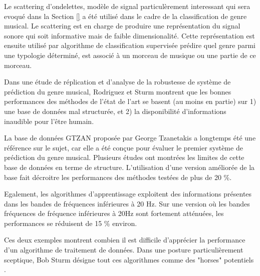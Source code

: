 Le scattering d'ondelettes, modèle de signal particulèrement interessant qui sera evoqué dans la Section \ref{} a été utilisé dans le cadre de la classification de genre musical. Le scattering est en charge de produire une représentation du signal sonore qui soit informative mais de faible dimensionalité. Cette représentation est ensuite utilisé par algorithme de classification supervisée prédire quel genre parmi une typologie déterminé, est associé à un morceau de musique ou une partie de ce morceau.

Dans une étude de réplication et d'analyse de la robustesse de système de prédiction du genre musical\cite{rodriguez2016analysing}, Rodriguez et Sturm montrent que les bonnes performances des méthodes de l'état de l'art se basent (au moins en partie) sur 1) une base de données mal structurée, et 2) la disponibilité d'informations inaudible pour l'être humain.

La base de données GTZAN proposée par George Tzanetakis a longtemps été une référence sur le sujet, car elle a été conçue pour évaluer le premier système de prédiction du genre musical\cite{tzanetakis2002musical}. Plusieurs études ont montrées les limites de cette base de données en terme de structure. L'utilisation d'une version améliorée de la base fait décroitre les performances des méthodes testées de plus de 20 \%.

Egalement, les algorithmes d'apprentissage exploitent des informations présentes dans les bandes de fréquences inférieures à 20 Hz. Sur une version où les bandes fréquences de fréquence inférieures à 20Hz sont fortement atténuées, les performances se réduisent de 15 \% environ.

Ces deux exemples montrent combien il est difficile d'apprécier la performance d'un algorithme de traitement de données. Dans une posture particulièrement sceptique, Bob Sturm désigne tout ces algorithmes comme des "horses" potentiels .

